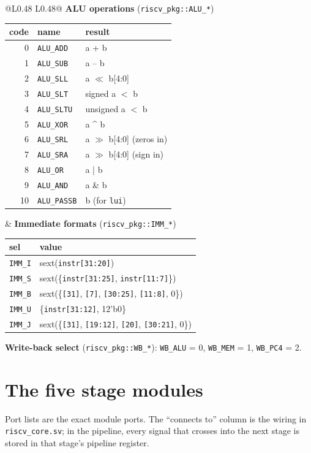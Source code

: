\documentclass[10pt]{article}
\newcommand{\sv}[1]{\texttt{#1}}
\begin{document}
\bigskip
\noindent\begin{tabular}{@{}L{0.48\linewidth} L{0.48\linewidth}@{}}
\textbf{ALU operations} (\sv{riscv\_pkg::ALU\_*})\par\smallskip
\small
\begin{tabular}{r l l}
\toprule
code & name & result\\ \midrule
0 & \sv{ALU\_ADD}  & a + b\\
1 & \sv{ALU\_SUB}  & a -- b\\
2 & \sv{ALU\_SLL}  & a $\ll$ b[4:0]\\
3 & \sv{ALU\_SLT}  & signed a $<$ b\\
4 & \sv{ALU\_SLTU} & unsigned a $<$ b\\
5 & \sv{ALU\_XOR}  & a \^{} b\\
6 & \sv{ALU\_SRL}  & a $\gg$ b[4:0] (zeros in)\\
7 & \sv{ALU\_SRA}  & a $\gg$ b[4:0] (sign in)\\
8 & \sv{ALU\_OR}   & a | b\\
9 & \sv{ALU\_AND}  & a \& b\\
10& \sv{ALU\_PASSB}& b (for \sv{lui})\\ \bottomrule
\end{tabular}
&
\textbf{Immediate formats} (\sv{riscv\_pkg::IMM\_*})\par\smallskip
\small
\begin{tabular}{l l}
\toprule
sel & value\\ \midrule
\sv{IMM\_I} & sext(\sv{instr[31:20]})\\
\sv{IMM\_S} & sext(\{\sv{instr[31:25]}, \sv{instr[11:7]}\})\\
\sv{IMM\_B} & sext(\{\sv{[31]}, \sv{[7]}, \sv{[30:25]}, \sv{[11:8]}, 0\})\\
\sv{IMM\_U} & \{\sv{instr[31:12]}, 12'b0\}\\
\sv{IMM\_J} & sext(\{\sv{[31]}, \sv{[19:12]}, \sv{[20]}, \sv{[30:21]}, 0\})\\ \bottomrule
\end{tabular}

\bigskip
\textbf{Write-back select} (\sv{riscv\_pkg::WB\_*}): \sv{WB\_ALU} = 0, \sv{WB\_MEM} = 1, \sv{WB\_PC4} = 2.
\end{tabular}

\clearpage
\section*{The five stage modules}
Port lists are the exact module ports. The ``connects to'' column is the wiring in \sv{riscv\_core.sv};
in the pipeline, every signal that crosses into the next stage is stored in that stage's pipeline register.
\end{document}
